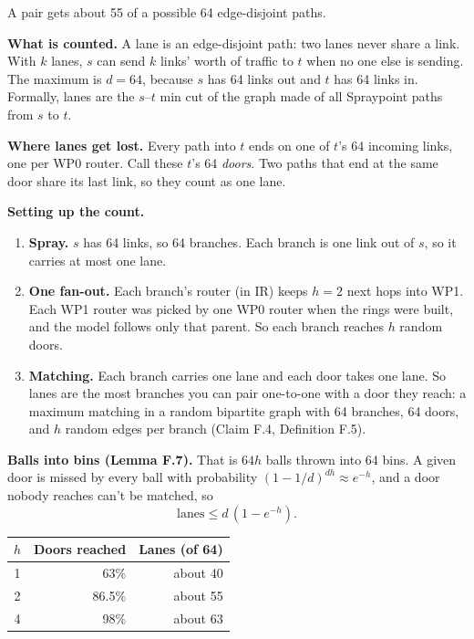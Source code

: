 \documentclass[11pt]{article}
\begin{document}
A pair gets about 55 of a possible 64 edge-disjoint paths.

\textbf{What is counted.} A lane is an edge-disjoint path: two lanes never share a link. With $k$ lanes, $s$ can send $k$ links' worth of traffic to $t$ when no one else is sending. The maximum is $d = 64$, because $s$ has 64 links out and $t$ has 64 links in. Formally, lanes are the $s$--$t$ min cut of the graph made of all Spraypoint paths from $s$ to $t$.

\textbf{Where lanes get lost.} Every path into $t$ ends on one of $t$'s 64 incoming links, one per WP0 router. Call these $t$'s 64 \emph{doors}. Two paths that end at the same door share its last link, so they count as one lane.

\textbf{Setting up the count.}
\begin{enumerate}
  \item \textbf{Spray.} $s$ has 64 links, so 64 branches. Each branch is one link out of $s$, so it carries at most one lane.
  \item \textbf{One fan-out.} Each branch's router (in IR) keeps $h = 2$ next hops into WP1. Each WP1 router was picked by one WP0 router when the rings were built, and the model follows only that parent. So each branch reaches $h$ random doors.
  \item \textbf{Matching.} Each branch carries one lane and each door takes one lane. So lanes are the most branches you can pair one-to-one with a door they reach: a maximum matching in a random bipartite graph with 64 branches, 64 doors, and $h$ random edges per branch (Claim F.4, Definition F.5).
\end{enumerate}

\textbf{Balls into bins (Lemma F.7).} That is $64 h$ balls thrown into 64 bins. A given door is missed by every ball with probability $(1 - 1/d)^{d h} \approx e^{-h}$, and a door nobody reaches can't be matched, so
\[
\text{lanes} \le d\,(1 - e^{-h}).
\]

\begin{center}
\begin{tabular}{@{}crr@{}}
\toprule
$h$ & Doors reached & Lanes (of 64) \\
\midrule
1 & 63\% & about 40 \\
2 & 86.5\% & about 55 \\
4 & 98\% & about 63 \\
\bottomrule
\end{tabular}
\end{center}
\end{document}
